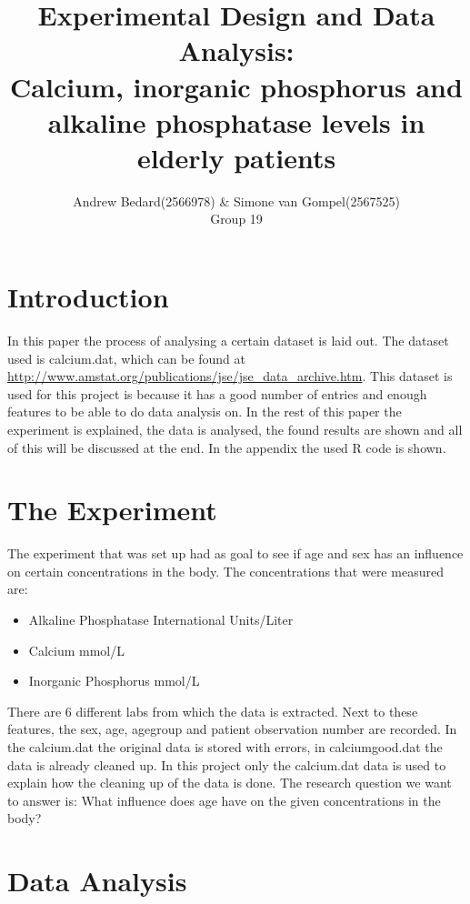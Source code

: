 \documentclass{article}
\title{Experimental Design and Data Analysis: \\Calcium, inorganic phosphorus and alkaline phosphatase levels in elderly patients}
\author{Andrew Bedard(2566978) \& Simone van Gompel(2567525) \\ Group 19}
\begin{document}
  \maketitle

  \section{Introduction}
    In this paper the process of analysing a certain dataset is laid out.
    The dataset used is calcium.dat, which can be found at \url{http://www.amstat.org/publications/jse/jse_data_archive.htm}.
    This dataset is used for this project is because it has a good number of entries and enough features to be able to do data analysis on.
    In the rest of this paper the experiment is explained, the data is analysed, the found results are shown and all of this will be discussed at the end.
    In the appendix the used R code is shown.

  \section{The Experiment}
    The experiment that was set up had as goal to see if age and sex has an influence on certain concentrations in the body.
    The concentrations that were measured are:
    \begin{itemize}
      \item Alkaline Phosphatase International Units/Liter
      \item Calcium mmol/L 
      \item Inorganic Phosphorus mmol/L
    \end{itemize}
    There are 6 different labs from which the data is extracted.
    Next to these features, the sex, age, agegroup and patient observation number are recorded.
    In the calcium.dat the original data is stored with errors, in calciumgood.dat the data is already cleaned up.
    In this project only the calcium.dat data is used to explain how the cleaning up of the data is done.
    The research question we want to answer is: What influence does age have on the given concentrations in the body?

  \section{Data Analysis}
\end{document}
